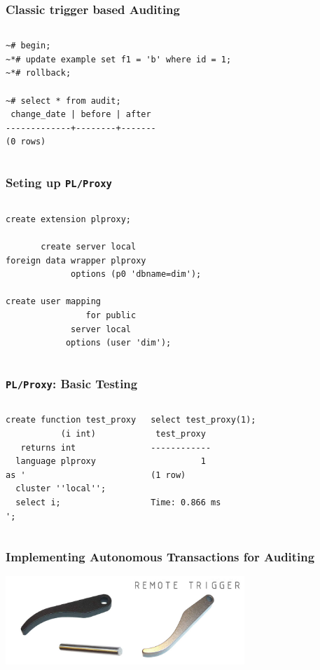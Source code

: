 \documentclass{beamer}
\begin{document}
\begin{frame}[fragile]
  \frametitle{Classic trigger based Auditing}

\begin{columns}
\begin{verbatim}
~# begin;
~*# update example set f1 = 'b' where id = 1;
~*# rollback;

~# select * from audit;
 change_date | before | after 
-------------+--------+-------
(0 rows)
\end{verbatim}  
\end{columns}
\end{frame}

\begin{frame}[fragile]
  \frametitle{Seting up \texttt{PL/Proxy}}

\begin{columns}
\begin{verbatim}
create extension plproxy;

       create server local
foreign data wrapper plproxy
             options (p0 'dbname=dim');

create user mapping
                for public
             server local
            options (user 'dim');
\end{verbatim}  
\end{columns}
\end{frame}

\begin{frame}[fragile]
  \frametitle{\texttt{PL/Proxy}: Basic Testing}

\begin{columns}
\begin{verbatim}
create function test_proxy
           (i int)
   returns int
  language plproxy
as '
  cluster ''local'';
  select i;
';
\end{verbatim}  

\begin{verbatim}
select test_proxy(1);
 test_proxy 
------------
          1
(1 row)

Time: 0.866 ms
\end{verbatim}  
\end{columns}
\end{frame}

\begin{frame}[fragile]
  \frametitle{Implementing Autonomous Transactions for Auditing}

\begin{center}
  \includegraphics[height=9em]{Stealth-Remote-Trigger.jpg}
\end{center}
\end{frame}
\end{document}
